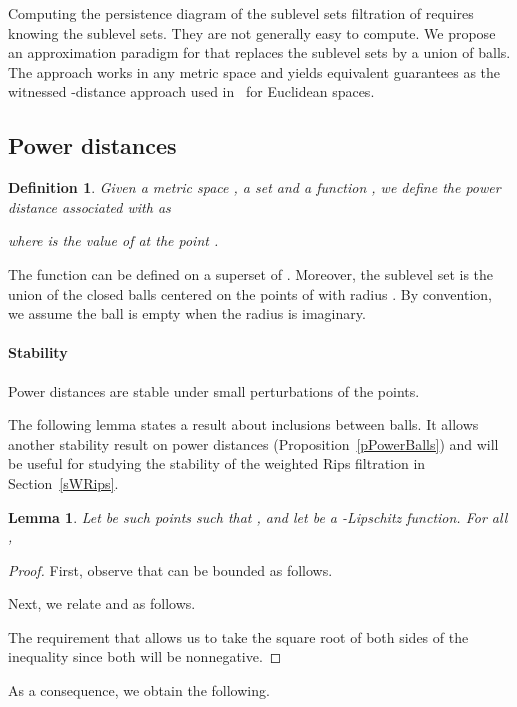 \documentclass[a4paper]{article}
\newtheorem{definition}[theorem]{Definition}
\newtheorem{lemma}[theorem]{Lemma}
\begin{document}
Computing the persistence diagram of the sublevel sets filtration of  requires knowing the sublevel sets. 
They are not generally easy to compute. 
We propose an approximation paradigm for  that replaces the sublevel sets by a union of balls.
The approach works in any metric space and yields equivalent guarantees as the witnessed -distance approach used in~\cite{wkdGMM} for Euclidean spaces.

\subsection{Power distances}\label{sApd}



\begin{definition}
  Given a metric space , a set  and a function , we define the \emph{power distance}  associated with  as
  
  where  is the value of  at the point .
\end{definition}

The function  can be defined on a superset of .
Moreover, the sublevel set  is the union of the closed balls centered on the points  of  with radius .
By convention, we assume the ball is empty when the radius is imaginary.

\paragraph{Stability\\}
Power distances are stable under small perturbations of the points.



The following lemma states a result about inclusions between balls.
It allows another stability result on power distances (Proposition~\ref{pPowerBalls}) and will be useful for studying the stability of the weighted Rips filtration in Section~\ref{sWRips}.

  \begin{lemma}\label{lPowerBalls}
    Let  be such points such that , and let  be a -Lipschitz function.
    For all ,
    
  \end{lemma}
  \begin{proof}
    First, observe that  can be bounded as follows.
    
    Next, we relate  and  as follows.
    
    The requirement that  allows us to take the square root of both sides of the inequality since both will be nonnegative.
  \end{proof}
\noindent
  As a consequence, we obtain the following.
\end{document}
